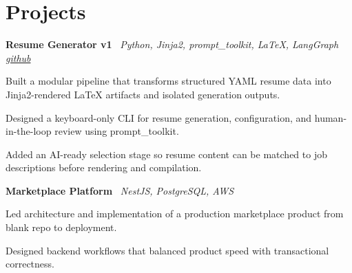 \section{Projects}

    \hspace{0.5em} \textbf{Resume Generator v1} \textbar \  \textit{Python, Jinja2, prompt\_toolkit, LaTeX, LangGraph}
\hfill \textit{\href{https://github.com/knarfthekant}{github}}
    \vspace{0.10 cm}
    \begin{onecolentry}
        \begin{highlights}
            \item Built a modular pipeline that transforms structured YAML resume data into Jinja2-rendered LaTeX artifacts and isolated generation outputs.

            \item Designed a keyboard-only CLI for resume generation, configuration, and human-in-the-loop review using prompt\_toolkit.

            \item Added an AI-ready selection stage so resume content can be matched to job descriptions before rendering and compilation.

        \end{highlights}
    \end{onecolentry}
    \vspace{0.10 cm}

    \hspace{0.5em} \textbf{Marketplace Platform} \textbar \  \textit{NestJS, PostgreSQL, AWS}

    \vspace{0.10 cm}
    \begin{onecolentry}
        \begin{highlights}
            \item Led architecture and implementation of a production marketplace product from blank repo to deployment.

            \item Designed backend workflows that balanced product speed with transactional correctness.

        \end{highlights}
    \end{onecolentry}
    \vspace{0.10 cm}

